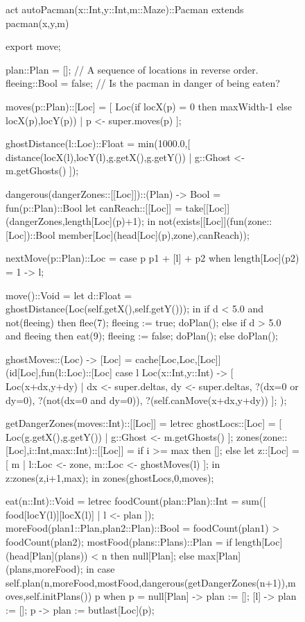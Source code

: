 \documentclass[5p,times]{elsarticle}
\begin{document}
\begin{figure}
\begin{ESL}
act autoPacman(x::Int,y::Int,m::Maze)::Pacman extends pacman(x,y,m) {  export move;

  plan::Plan             = [];         // A sequence of locations in reverse order.
  fleeing::Bool          = false;      // Is the pacman in danger of being eaten?
  
  moves(p::Plan)::[Loc] = [ Loc(if locX(p) = 0 then maxWidth-1 else locX(p),locY(p)) | p <- super.moves(p) ];

  ghostDistance(l::Loc)::Float = min(1000.0,[ distance(locX(l),locY(l),g.getX(),g.getY()) | g::Ghost <- m.getGhosts() ]);

  dangerous(dangerZones::[[Loc]])::(Plan) -> Bool = fun(p::Plan)::Bool
    let canReach::[[Loc]] = take[[Loc]](dangerZones,length[Loc](p)+1);
    in not(exists[[Loc]](fun(zone::[Loc])::Bool member[Loc](head[Loc](p),zone),canReach));
  
  nextMove(p::Plan)::Loc = case p { p1 + [l] + p2 when length[Loc](p2) = 1 -> l; }
      
  move()::Void = 
    let d::Float = ghostDistance(Loc(self.getX(),self.getY()));
    in if d < 5.0 and not(fleeing) then { flee(7); fleeing := true; doPlan(); } 
       else if d > 5.0 and fleeing then { eat(9); fleeing := false; doPlan(); } 
       else doPlan();

  ghostMoves::(Loc) -> [Loc] = cache[Loc,Loc,[Loc]](id[Loc],fun(l::Loc)::[Loc]
    case l {
      Loc(x::Int,y::Int) -> [ Loc(x+dx,y+dy) | 
        dx <- super.deltas, dy <- super.deltas, ?(dx=0 or dy=0), ?(not(dx=0 and dy=0)), ?(self.canMove(x+dx,y+dy)) ];
    });

  getDangerZones(moves::Int)::[[Loc]] = 
    letrec 
      ghostLocs::[Loc] = [ Loc(g.getX(),g.getY()) | g::Ghost <- m.getGhosts() ];
      zones(zone::[Loc],i::Int,max::Int)::[[Loc]] =
        if i >= max then []; else let z::[Loc] = [ m  | l::Loc <- zone, m::Loc <- ghostMoves(l) ]; in z:zones(z,i+1,max);
    in zones(ghostLocs,0,moves);

  eat(n::Int)::Void =
    letrec
      foodCount(plan::Plan)::Int = sum([ food[locY(l)][locX(l)] | l <- plan ]);
      moreFood(plan1::Plan,plan2::Plan)::Bool = foodCount(plan1) > foodCount(plan2);
      mostFood(plans::Plans)::Plan = if length[Loc](head[Plan](plans)) < n then null[Plan]; else max[Plan](plans,moreFood);
    in case self.plan(n,moreFood,mostFood,dangerous(getDangerZones(n+1)),moves,self.initPlans()) {
      p when p = null[Plan] -> plan := [];
      [l]                   -> plan := [];
      p                     -> plan := butlast[Loc](p);
    }

}
\end{ESL}
\end{figure}
\end{document}

